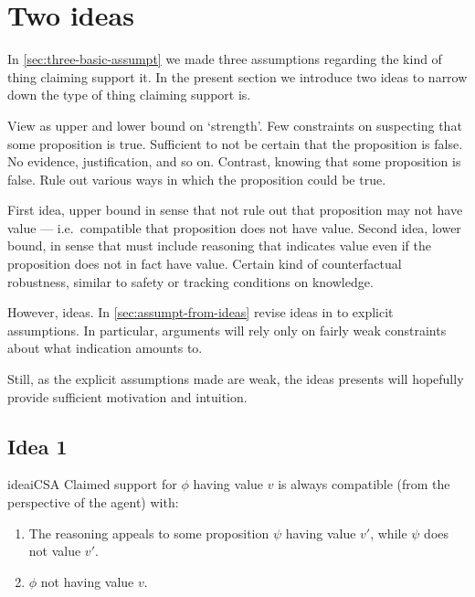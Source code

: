 \section{Two ideas}
\label{sec:two-ideas}

\begin{note}
  In \ref{sec:three-basic-assumpt} we made three assumptions regarding the kind of thing claiming support it.
  In the present section we introduce two ideas to narrow down the type of thing claiming support is.

  View as upper and lower bound on `strength'.
  Few constraints on suspecting that some proposition is true.
  Sufficient to not be certain that the proposition is false.
  No evidence, justification, and so on.
  Contrast, knowing that some proposition is false.
  Rule out various ways in which the proposition could be true.

  First idea, upper bound in sense that not rule out that proposition may not have value --- i.e.\ compatible that proposition does not have value.
  Second idea, lower bound, in sense that must include reasoning that indicates value even if the proposition does not in fact have value.
  Certain kind of counterfactual robustness, similar to safety or tracking conditions on knowledge.

  However, ideas.
  In \ref{sec:assumpt-from-ideas} revise ideas in to explicit assumptions.
  In particular, arguments will rely only on fairly weak constraints about what indication amounts to.

  Still, as the explicit assumptions made are weak, the ideas presents will hopefully provide sufficient motivation and intuition.
  \end{note}

\subsection{Idea 1}
\label{sec:idea-1}

\begin{note}
  \begin{restatable}[\ideaCSA{-} --- \ideaCSA{}]{idea}{iCSA}
    \label{idea:defs-for-CS}
    Claimed support for \(\phi\) having value \(v\) is always compatible (from the perspective of the agent) with:
    \begin{enumerate}
    \item The reasoning appeals to some proposition \(\psi\) having value \(v'\), while \(\psi\) does not value \(v'\).
    \item \(\phi\) not having value \(v\).
    \end{enumerate}
  \end{restatable}
\end{note}

